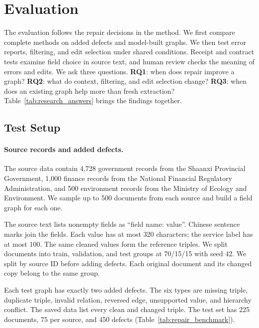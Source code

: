 \section{Evaluation}
\label{sec:eval}
\label{sec:experiments}

The evaluation follows the repair decisions in the method.
We first compare complete methods on added defects and model-built graphs.
We then test error reports, filtering, and edit selection under shared
conditions. Receipt and contract tests examine field choice in source text,
and human review checks the meaning of errors and edits.
We ask three questions. \textbf{RQ1}: when does repair improve a graph?
\textbf{RQ2}: what do context, filtering, and edit selection change?
\textbf{RQ3}: when does an existing graph help more than fresh extraction?
Table~\ref{tab:research_answers} brings the findings together.

\subsection{Test Setup}
\label{sec:eval:setup}

\paragraph{Source records and added defects.}
The source data contain 4,728 government records from the Shaanxi Provincial
Government, 1,000 finance records from the National Financial Regulatory
Administration, and 500 environment records from the Ministry of Ecology
and Environment. We sample up to 500 documents from each source and build a
field graph for each one.

The source text lists nonempty fields as ``field name: value''.
Chinese sentence marks join the fields. Each value has at most 320 characters;
the service label has at most 100. The same cleaned values form the reference
triples. We split documents into train, validation, and test groups at
70/15/15 with seed 42. We split by source ID before adding defects.
Each original document and its changed copy belong to the same group.

Each test graph has exactly two added defects. The six types are missing
triple, duplicate triple, invalid relation, reversed edge, unsupported value,
and hierarchy conflict. The saved data list every clean and changed triple.
The test set has 225 documents, 75 per source, and 450 defects
(Table~\ref{tab:repair_benchmark}).

